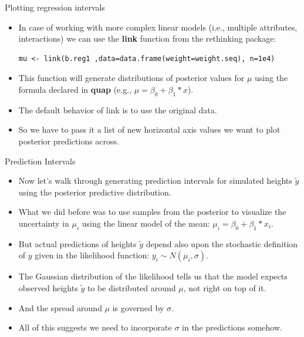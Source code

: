 \documentclass[handout]{beamer}
\begin{document}
\begin{frame}[fragile]{Plotting regression intervals}
\scriptsize{
\begin{itemize}


\item In case of working with more complex linear models (i.e., multiple attributes, interactions) we can use the \textbf{link} function from the rethinking package:

\begin{verbatim}
mu <- link(b.reg1 ,data=data.frame(weight=weight.seq), n=1e4)

\end{verbatim}

\item This function will generate distributions of posterior values for $\mu$ using the formula declared in \textbf{quap} (e.g., $\mu= \beta_0 + \beta_1 * x$).

\item The default behavior of link is to use the original data.

\item So we have to pass it a list of new horizontal axis values we want to plot posterior predictions across.

\end{itemize}
 

 
}
\end{frame}


\begin{frame}[fragile]{Prediction Intervals}
\scriptsize{
\begin{itemize}


\item Now let’s walk through generating prediction intervals for simulated heights $\tilde{y}$ using the posterior predictive distribution.

\item What we did before was to use samples from the posterior to visualize the uncertainty in $\mu_i$ using the linear model of the mean: $\mu_i=\beta_0+\beta_1*x_i$. 

\item But actual predictions of heights $\tilde{y}$ depend also upon the stochastic definition of $y$ given in the likelihood function: $y_i\sim N(\mu_i,\sigma)$.

\item The Gaussian distribution of the likelihood tells us that the model expects observed heights $\tilde{y}$ to be distributed around $\mu$, not right on top of it. 

\item And the spread around $\mu$ is governed by $\sigma$. 

\item All of this suggests we need to incorporate $\sigma$ in the predictions somehow.

 


\end{itemize}
 

 
}
\end{frame}
\end{document}
